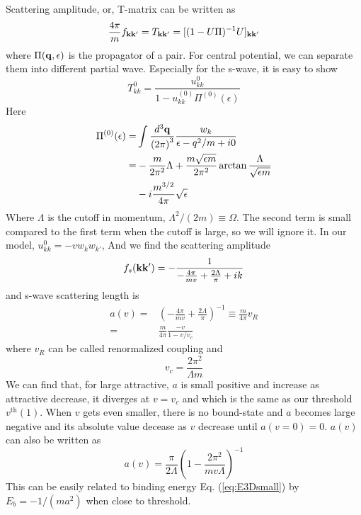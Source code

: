 \documentclass[aps,prb,showpacs,3p,twocolumn]{elsarticle}
\begin{document}
Scattering amplitude, or, T-matrix can be written as 
\begin{equation}
\frac{4\pi}{m}f_{\mathbf{k}\mathbf{k}'}=T_{\mathbf{k}\mathbf{k}'}=[(1-U\Pi)^{-1}U]_{\mathbf{k}\mathbf{k}'}
\end{equation}
where $\Pi(\mathbf{q},\epsilon)$ is the propagator of a pair.  For central potential, we can separate them into different partial wave. Especially for the s-wave, it is easy to show 
\begin{equation}
T^{0}_{kk}=\frac{u^{0}_{kk}}{1-u^{(0)}_{kk}\Pi^{(0)}(\epsilon)}
\end{equation}
Here 
\begin{equation}
\begin{split}
\Pi^{(0)}(\epsilon)=&\int\frac{d^{3}\mathbf{q}}{{(2\pi)}^{3}}\frac{w_{k}}{\epsilon-q^{2}/m+i0}\\
=&-\frac{m}{2\pi^{2}}{\Lambda}+\frac{m\sqrt{\epsilon{m}}}{2\pi^{2}}\arctan\frac{\Lambda}{\sqrt{\epsilon{m}}}\\
&-i\frac{m^{3/2}}{4\pi}\sqrt{\epsilon}
\end{split}
\end{equation}
Where $\Lambda$ is the cutoff in momentum, $\Lambda^{2}/(2m)\equiv\Omega$. The second term is small compared to the first term when the cutoff is large, so we will ignore it.  In our model, $u^{0}_{kk}=-vw_{k}w_{k'}$, And we find the scattering amplitude 
\begin{equation}
f_{s}(\mathbf{k}\mathbf{k}')=-\frac{1}{-\frac{4\pi}{mv}+\frac{2\Lambda}{\pi}+ik}
\end{equation}
and s-wave scattering length is 
\begin{equation}
\begin{split}
a(v)=&\left(-\frac{4\pi}{mv}+\frac{2\Lambda}{\pi}\right)^{-1}\equiv\frac{m}{4\pi}v_{R}\\
     =&\frac{m}{4\pi}\frac{-v}{1-v/v_{c}}
     \end{split}
\end{equation}
where $v_{R}$ can be called renormalized coupling and 
\begin{equation}
v_{c}=\frac{2\pi^{2}}{\Lambda{m}}
\end{equation}
We can find that, for large attractive, $a$ is small positive and increase as attractive decrease, it diverges at $v=v_{c}$ and which is the same as our threshold $v^{\text{th}}(1)$.  When $v$ gets even smaller, there is no bound-state and $a$ becomes large negative and its absolute value decease as $v$ decrease until $a(v=0)=0$. 
$a(v)$ can also be written as
\begin{equation}
a(v)=\frac{\pi}{2\Lambda}\left(1-\frac{2\pi^{2}}{mv\Lambda}\right)^{-1}
\end{equation}
This can be easily related to binding energy Eq. (\ref{eq:E3Dsmall}) by $E_{b}=-1/(ma^{2})$ when close to threshold. 
%
%

\end{document}
